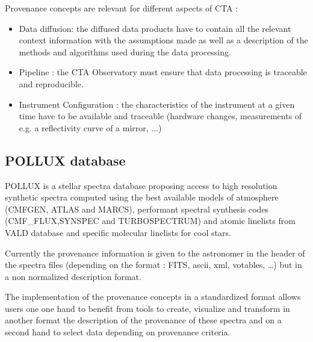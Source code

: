 Provenance concepts are relevant for different aspects of CTA :
\begin{itemize}
\item Data diffusion: the diffused data products have to contain all the relevant context information with the assumptions made as well as a description of the methods and algorithms used during the data processing.
\item Pipeline : the CTA Observatory must ensure that data processing is traceable and reproducible.
\item Instrument Configuration : the characteristics of the instrument at a given time have to be available and traceable (hardware changes, measurements of e.g. a reflectivity curve of a mirror, ...)
\end{itemize}


\subsection{POLLUX database}

POLLUX is a stellar spectra database proposing access to high resolution synthetic spectra computed using the best available models of atmosphere (CMFGEN, ATLAS and MARCS), performant spectral synthesis codes (CMF\_FLUX,SYNSPEC and TURBOSPECTRUM) and atomic linelists from VALD database and specific molecular linelists for cool stars. 

Currently the provenance information is given to the astronomer in the header of the spectra files (depending on the format : FITS, ascii, xml, votables, …) but in a non normalized description format. 

The implementation of the provenance concepts in a standardized format allows users one one hand to benefit from tools to create, visualize and transform in another format the description of the provenance of these spectra and on a second hand to select data depending on provenance criteria.

 
